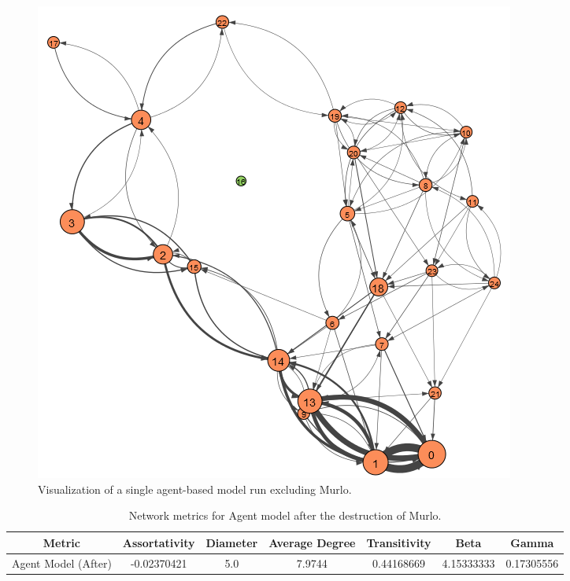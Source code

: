 \documentclass[12pt,a4paper]{thesis}
\begin{document}
\begin{figure}[H]
\centering
\includegraphics[width=0.9\linewidth]{./AfterViz/agent}
\caption{Visualization of a single agent-based model run excluding Murlo.}
\label{fig:agentAfter}
\end{figure}

\begin{table}[H]
\centering
\caption{Network metrics for Agent model after the destruction of Murlo.}
\tiny
\begin{tabular}{|c|c|c|c|c|c|c|}
\hline Metric & Assortativity & Diameter & Average Degree & Transitivity & Beta & Gamma \\ 
\hline Agent Model (After) & -0.02370421 & 5.0 & 7.9744 & 0.44168669 & 4.15333333 & 0.17305556 \\ 
\hline 
\end{tabular} 
\label{tab:agentNetAfter}
\end{table}
\end{document}

